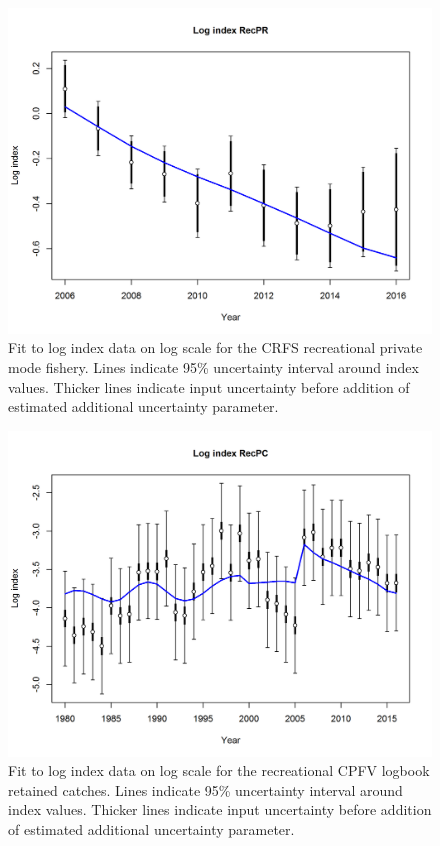 \documentclass[12pt,]{article}
\begin{document}
\begin{figure}[htbp]
\centering
\includegraphics{r4ss/plots_mod1/index5_logcpuefit_RecPR.png}
\caption{Fit to log index data on log scale for the CRFS recreational
private mode fishery. Lines indicate 95\% uncertainty interval around
index values. Thicker lines indicate input uncertainty before addition
of estimated additional uncertainty parameter.
\label{fig:index5_logcpuefit_RecPR}}
\end{figure}

\begin{figure}[htbp]
\centering
\includegraphics{r4ss/plots_mod1/index5_logcpuefit_RecPC.png}
\caption{Fit to log index data on log scale for the recreational CPFV
logbook retained catches. Lines indicate 95\% uncertainty interval
around index values. Thicker lines indicate input uncertainty before
addition of estimated additional uncertainty parameter.
\label{fig:index5_logcpuefit_RecPC}}
\end{figure}
\end{document}

